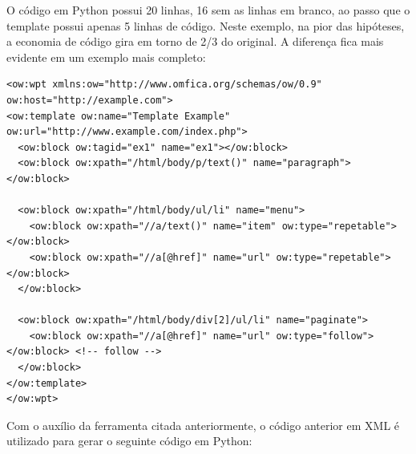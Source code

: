 O código em Python possui 20 linhas, 16 sem as linhas em branco, ao passo que o template possui apenas 5 linhas de código. Neste exemplo, na pior das hipóteses, a economia de código gira em torno de 2/3 do original. A diferença fica mais evidente em um exemplo mais completo:

\begin{lstlisting}
<ow:wpt xmlns:ow="http://www.omfica.org/schemas/ow/0.9"
ow:host="http://example.com">
<ow:template ow:name="Template Example" ow:url="http://www.example.com/index.php">
  <ow:block ow:tagid="ex1" name="ex1"></ow:block>
  <ow:block ow:xpath="/html/body/p/text()" name="paragraph"></ow:block>
  
  <ow:block ow:xpath="/html/body/ul/li" name="menu">
    <ow:block ow:xpath="//a/text()" name="item" ow:type="repetable"></ow:block>
    <ow:block ow:xpath="//a[@href]" name="url" ow:type="repetable"></ow:block>
  </ow:block>
  
  <ow:block ow:xpath="/html/body/div[2]/ul/li" name="paginate">
    <ow:block ow:xpath="//a[@href]" name="url" ow:type="follow"></ow:block> <!-- follow -->
  </ow:block>
</ow:template> 
</ow:wpt>
\end{lstlisting}

Com o auxílio da ferramenta citada anteriormente, o código anterior em XML é utilizado para gerar o seguinte código em Python: 

